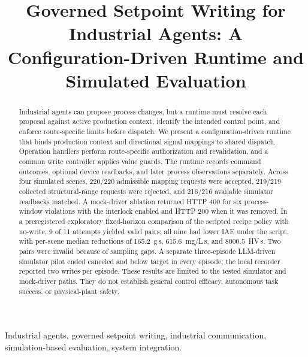 \documentclass[journal]{IEEEtran}
\begin{document}

\title{Governed Setpoint Writing for Industrial Agents: A Configuration-Driven Runtime and Simulated Evaluation}

\author{}

\maketitle

\begin{abstract}
Industrial agents can propose process changes, but a runtime must resolve each proposal against active production context, identify the intended control point, and enforce route-specific limits before dispatch. We present a configuration-driven runtime that binds production context and directional signal mappings to shared dispatch. Operation handlers perform route-specific authorization and revalidation, and a common write controller applies value guards. The runtime records command outcomes, optional device readbacks, and later process observations separately.
Across four simulated scenes, 220/220 admissible mapping requests were accepted, 219/219 collected structural-range requests were rejected, and 216/216 available simulator readbacks matched. A mock-driver ablation returned HTTP 400 for six process-window violations with the interlock enabled and HTTP 200 when it was removed. In a preregistered exploratory fixed-horizon comparison of the scripted recipe policy with no-write, 9 of 11 attempts yielded valid pairs; all nine had lower IAE under the script, with per-scene median reductions of 165.2~g\,s, 615.6~mg/L\,s, and 8000.5~HV\,s. Two pairs were invalid because of sampling gaps. A separate three-episode LLM-driven simulator pilot ended canceled and below target in every episode; the local recorder reported two writes per episode. These results are limited to the tested simulator and mock-driver paths. They do not establish general control efficacy, autonomous task success, or physical-plant safety.
\end{abstract}

\begin{IEEEkeywords}
Industrial agents, governed setpoint writing, industrial communication,
simulation-based evaluation, system integration.
\end{IEEEkeywords}

\IEEEpeerreviewmaketitle
\end{document}

